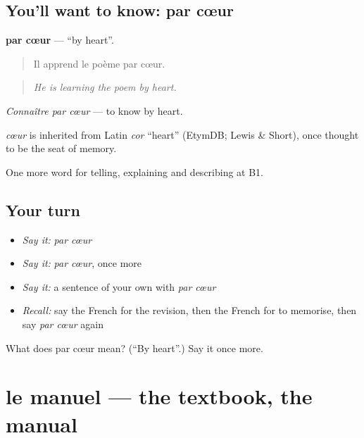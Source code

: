 \subsection*{You'll want to know: par cœur}
\textbf{par cœur} — \textquotedblleft{}by heart\textquotedblright{}.

\begin{quote}
Il apprend le poème par cœur.
\end{quote}

\begin{quote}
\emph{He is learning the poem by heart.}
\end{quote}

\emph{Connaître par cœur} — to know by heart.

\begin{cousinweb}
\emph{cœur} is inherited from Latin \emph{cor} \textquotedblleft{}heart\textquotedblright{} (EtymDB; Lewis \& Short), once thought to be the seat of memory.
\end{cousinweb}

\begin{grammarlens}[title={What you've built}]
One more word for telling, explaining and describing at B1.
\end{grammarlens}

\subsection*{Your turn}
\begin{itemize}
\raggedright
  \item \emph{Say it:} \emph{par cœur}
  \item \emph{Say it:} \emph{par cœur}, once more
  \item \emph{Say it:} a sentence of your own with \emph{par cœur}
  \item \emph{Recall:} say the French for the revision, then the French for to memorise, then say \emph{par cœur} again
\end{itemize}

\begin{tcolorbox}[breakable,colback=teal!4,colframe=teal!35!black,title={Before you move on}]
What does par cœur mean? (\textquotedblleft{}By heart\textquotedblright{}.) Say it once more.
\end{tcolorbox}
\section[le manuel]{le manuel — the textbook, the manual}

